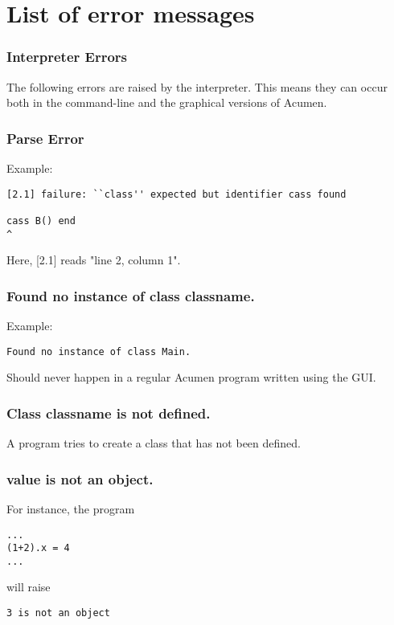 \section{List of error messages}
\subsubsection{Interpreter Errors}

The following errors are raised by the interpreter. This means they can occur both in the command-line and the graphical versions of Acumen.
\subsubsection{Parse Error}

Example:

\begin{lstlisting}
[2.1] failure: ``class'' expected but identifier cass found

cass B() end
^
\end{lstlisting}

Here, [2.1] reads "line 2, column 1".
\subsubsection{Found no instance of class classname.}

Example:

\begin{lstlisting}
Found no instance of class Main.
\end{lstlisting}

Should never happen in a regular Acumen program written using the GUI.
\subsubsection{Class classname is not defined.}

A program tries to create a class that has not been defined.
\subsubsection{value is not an object.}

For instance, the program
\begin{lstlisting}
...
(1+2).x = 4
...
\end{lstlisting}
%
will raise
%
\begin{lstlisting}
3 is not an object
\end{lstlisting}

